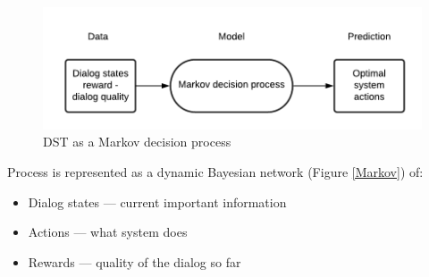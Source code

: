 \documentclass[12pt,titlepage,a4paper]{article}
\begin{document}
\begin{figure}[ht]
    \centering
    \includegraphics[width=0.8\linewidth]{training-state-tr-1.png}
    \caption{DST as a Markov decision process}
    \label{MDP}
\end{figure}

Process is represented as a dynamic Bayesian network (Figure \ref{Markov}) of: 
\begin{itemize}
    \item Dialog states --- current important information
    \item Actions --- what system does
    \item Rewards --- quality of the dialog so far
\end{itemize}
\end{document}
